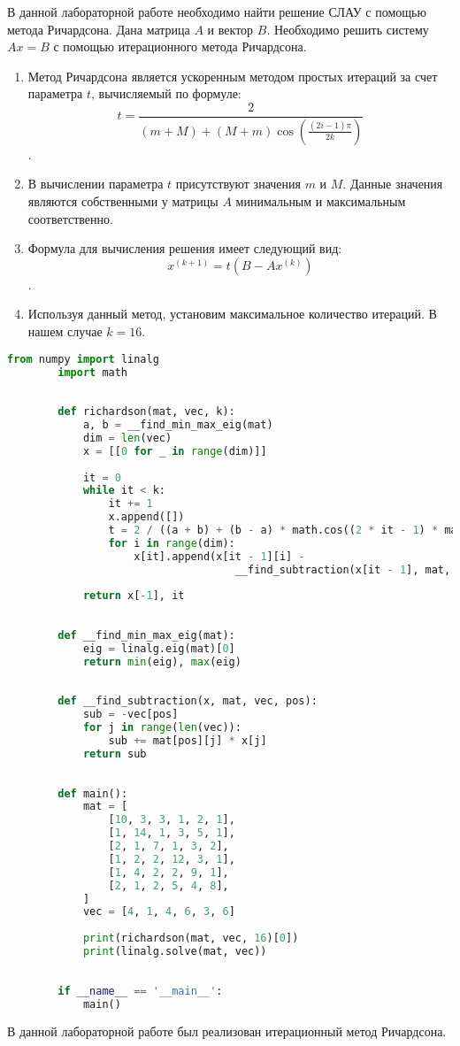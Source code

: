 \documentclass[14pt, a4paper, fleqn]{extarticle}
\begin{document}
	\tableofcontents
	\pagebreak
	В данной лабораторной работе необходимо найти решение СЛАУ с помощью метода Ричардсона.
	Дана матрица $A$ и вектор $B$. Необходимо решить систему $Ax = B$ с помощью итерационного метода Ричардсона.
	\begin{enumerate}
		\item Метод Ричардсона является ускоренным методом простых итераций за счет параметра $t$, вычисляемый по формуле: $$t = \dfrac{2}{(m + M) + (M + m)\cos\left( \frac{(2i-1)\pi}{2k}\right) }$$.
		\item В вычислении параметра $t$ присутствуют значения $m$ и $M$. Данные значения являются собственными у матрицы $A$ минимальным и максимальным соответственно.	
		\item Формула для вычисления решения имеет следующий вид:
		$$
		x^{(k+1)} = t(B - Ax^{(k)})
		$$.
		\item Используя данный метод, установим максимальное количество итераций. В нашем случае $k = 16$.
	\end{enumerate}
	\pagebreak
	
	\begin{lstlisting}[language=Python, caption={Компьютерная реализация алгоритма}]
		from numpy import linalg
		import math
		
		
		def richardson(mat, vec, k):
			a, b = __find_min_max_eig(mat)
			dim = len(vec)
			x = [[0 for _ in range(dim)]]
		
			it = 0
			while it < k:
				it += 1
				x.append([])
				t = 2 / ((a + b) + (b - a) * math.cos((2 * it - 1) * math.pi / (2 * k)))
				for i in range(dim):
					x[it].append(x[it - 1][i] -
									__find_subtraction(x[it - 1], mat, vec, i) * t)
		
			return x[-1], it
		
		
		def __find_min_max_eig(mat):
			eig = linalg.eig(mat)[0]
			return min(eig), max(eig)
		
		
		def __find_subtraction(x, mat, vec, pos):
			sub = -vec[pos]
			for j in range(len(vec)):
				sub += mat[pos][j] * x[j]
			return sub
		
		
		def main():
			mat = [
				[10, 3, 3, 1, 2, 1],
				[1, 14, 1, 3, 5, 1],
				[2, 1, 7, 1, 3, 2],
				[1, 2, 2, 12, 3, 1],
				[1, 4, 2, 2, 9, 1],
				[2, 1, 2, 5, 4, 8],
			]
			vec = [4, 1, 4, 6, 3, 6]
		
			print(richardson(mat, vec, 16)[0])
			print(linalg.solve(mat, vec))
		
		
		if __name__ == '__main__':
			main()
	\end{lstlisting}
	В данной лабораторной работе был реализован итерационный метод Ричардсона.
\end{document}
